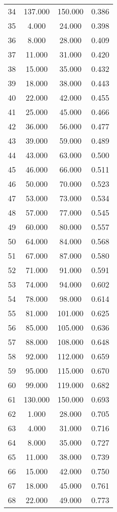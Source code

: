 \begin{tabular}{cccc}
  34 & 137.000 & 150.000 & 0.386 \\ 
  35 & 4.000 & 24.000 & 0.398 \\ 
  36 & 8.000 & 28.000 & 0.409 \\ 
  37 & 11.000 & 31.000 & 0.420 \\ 
  38 & 15.000 & 35.000 & 0.432 \\ 
  39 & 18.000 & 38.000 & 0.443 \\ 
  40 & 22.000 & 42.000 & 0.455 \\ 
  41 & 25.000 & 45.000 & 0.466 \\ 
  42 & 36.000 & 56.000 & 0.477 \\ 
  43 & 39.000 & 59.000 & 0.489 \\ 
  44 & 43.000 & 63.000 & 0.500 \\ 
  45 & 46.000 & 66.000 & 0.511 \\ 
  46 & 50.000 & 70.000 & 0.523 \\ 
  47 & 53.000 & 73.000 & 0.534 \\ 
  48 & 57.000 & 77.000 & 0.545 \\ 
  49 & 60.000 & 80.000 & 0.557 \\ 
  50 & 64.000 & 84.000 & 0.568 \\ 
  51 & 67.000 & 87.000 & 0.580 \\ 
  52 & 71.000 & 91.000 & 0.591 \\ 
  53 & 74.000 & 94.000 & 0.602 \\ 
  54 & 78.000 & 98.000 & 0.614 \\ 
  55 & 81.000 & 101.000 & 0.625 \\ 
  56 & 85.000 & 105.000 & 0.636 \\ 
  57 & 88.000 & 108.000 & 0.648 \\ 
  58 & 92.000 & 112.000 & 0.659 \\ 
  59 & 95.000 & 115.000 & 0.670 \\ 
  60 & 99.000 & 119.000 & 0.682 \\ 
  61 & 130.000 & 150.000 & 0.693 \\ 
  62 & 1.000 & 28.000 & 0.705 \\ 
  63 & 4.000 & 31.000 & 0.716 \\ 
  64 & 8.000 & 35.000 & 0.727 \\ 
  65 & 11.000 & 38.000 & 0.739 \\ 
  66 & 15.000 & 42.000 & 0.750 \\ 
  67 & 18.000 & 45.000 & 0.761 \\ 
  68 & 22.000 & 49.000 & 0.773 \\ 

\end{tabular}
